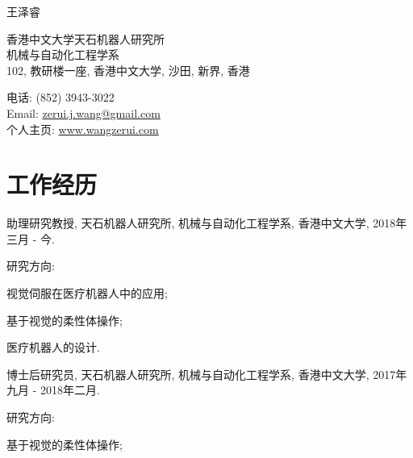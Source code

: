 \documentclass[10pt,letterpaper]{article}
\renewcommand\emph[1]{%
  {#1}
}
\def\name{王泽睿}
\renewenvironment{itemize}{
\begin{list}{}{
    \setlength{\leftmargin}{1.5em}
    \setlength{\itemsep}{0.25em}
    \setlength{\parskip}{0pt}
    \setlength{\parsep}{0.25em}
    }
    }{
\end{list}
}
\begin{document}
{\huge \name}


\bigskip

\begin{minipage}[t]{0.595\textwidth}
    香港中文大学天石机器人研究所 \\
    机械与自动化工程学系 \\
    102, 教研楼一座, 香港中文大学, 沙田, 新界, 香港
\end{minipage}
\begin{minipage}[t]{0.395\textwidth}
    电话: (852) 3943-3022 \\
    Email: \href{mailto:zerui.j.wang@gmail.com}{zerui.j.wang@gmail.com} \\
    个人主页: \href{http://www.wangzerui.com/}{www.wangzerui.com}
\end{minipage}

\section*{工作经历}

\begin{itemize}
    \item 助理研究教授, 天石机器人研究所, 机械与自动化工程学系, 香港中文大学, 2018年三月 - 今.
    \begin{itemize}
        \item \emph{研究方向:}
        \begin{itemize}
            \item 视觉伺服在医疗机器人中的应用;
            \item 基于视觉的柔性体操作;
            \item 医疗机器人的设计.
        \end{itemize}
    \end{itemize}

    \item 博士后研究员, 天石机器人研究所, 机械与自动化工程学系, 香港中文大学, 2017年九月 - 2018年二月.
    \begin{itemize}
        \item \emph{研究方向:}
        \begin{itemize}
            \item 基于视觉的柔性体操作;
        \end{itemize}
    \end{itemize}
\end{itemize}
\end{document}
